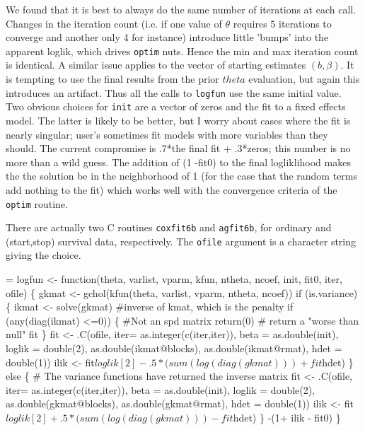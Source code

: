 \documentclass{article}
\begin{document}
We found that it is best to always do the same number of iterations at
each call.  Changes in the iteration count (i.e. if one value of
$\theta$ requires 5 iterations to converge and another only 4 for instance) 
introduce little 'bumps' into the apparent loglik, which
drives \Verb!optim! nuts. Hence the min and max iteration count is identical.
A similar issue applies to the vector of starting estimates $(b, \beta)$.
It is tempting to use the final results from the prior $theta$ evaluation,
but again this introduces an artifact.
Thus all the calls to \Verb!logfun! use the same initial value.
Two obvious choices for \Verb!init! are a vector of zeros and the fit
to a fixed effects model.  The latter is likely to be better,
but I worry about cases where the fit is nearly
singular; user's sometimes fit models with more variables than they should. %
The current compromise is .7*the final fit + .3*zeros; this number is no
more than a wild guess.
The addition of (1 -fit0) to the final logliklihood makes the 
the solution be in the neighborhood of 1 (for the case that the random
terms add nothing to the fit)
which works well with the convergence criteria of
the \Verb!optim! routine.

There are actually two C routines \Verb!coxfit6b! and \Verb?agfit6b?, for ordinary
and (start,stop) survival data, respectively.  The \Verb!ofile! argument 
is a character string giving the choice.
\begin{nwchunk}
=
 logfun <- function(theta, varlist, vparm, kfun, ntheta, ncoef, 
                    init, fit0, iter, ofile) \{
     gkmat <- gchol(kfun(theta, varlist, vparm, ntheta, ncoef))
     if (is.variance) \{
         ikmat <- solve(gkmat)  #inverse of kmat, which is the penalty
         if (any(diag(ikmat) <=0)) \{ #Not an spd matrix
             return(0)  # return a "worse than null" fit
         \}
         fit <- .C(ofile,
                   iter= as.integer(c(iter,iter)),
                   beta = as.double(init),
                   loglik = double(2),
                   as.double(ikmat@blocks),
                   as.double(ikmat@rmat),
                   hdet = double(1))
         ilik <- fit$loglik[2] -
             .5*(sum(log(diag(gkmat))) + fit$hdet)
     \}
     else \{
         # The variance functions have returned the inverse matrix
         fit <- .C(ofile,
                   iter= as.integer(c(iter,iter)),
                   beta = as.double(init),
                   loglik = double(2),
                   as.double(gkmat@blocks),
                   as.double(gkmat@rmat),
                   hdet = double(1))
         ilik <- fit$loglik[2] +
             .5*(sum(log(diag(gkmat))) - fit$hdet)
     \}
     -(1+ ilik - fit0)
     \}
\end{nwchunk}
\end{document}
